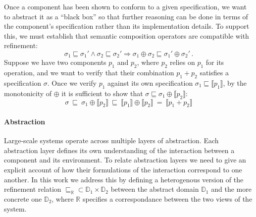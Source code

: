\documentclass[sigplan,10pt,review,anonymous]{acmart}
\begin{document}
Once a component has been shown to conform to a given specification,
we want to abstract it as a ``black box''
so that further reasoning can be done in terms of
the component's specification rather than its implementation details.
To support this,
we must establish that semantic composition operators
are compatible with refinement:
\[ \sigma_1 \sqsubseteq \sigma_1' \wedge
   \sigma_2 \sqsubseteq \sigma_2' \Rightarrow
   \sigma_1 \oplus \sigma_2 \sqsubseteq \sigma_1' \oplus \sigma_2' \,. \]
Suppose we have two components $p_1$ and $p_2$,
where $p_2$ relies on $p_1$ for its operation,
and we want to verify that their combination $p_1 + p_2$
satisfies a specification $\sigma$.
Once we verify $p_1$ against its own specification
$\sigma_1 \sqsubseteq \llbracket p_1 \rrbracket$,
by the monotonicity of ${\oplus}$ it is sufficient to show that
$\sigma \sqsubseteq \sigma_1 \oplus \llbracket p_2 \rrbracket$:
\[
   \sigma \:\sqsubseteq\:
   \sigma_1 \oplus \llbracket p_2 \rrbracket \:\sqsubseteq\:
   \llbracket p_1 \rrbracket \oplus \llbracket p_2 \rrbracket \:=\:
   \llbracket p_1 + p_2 \rrbracket
\]


\paragraph{Abstraction} %

Large-scale systems operate across multiple layers of abstraction.
Each abstraction layer defines its own understanding of the interaction
between a component and its environment.
To relate abstraction layers we need to give
an explicit account of how their formulations of the interaction
correspond to one another.
In this work we address this by defining a heterogenous version
of the refinement relation
${\sqsubseteq_\mathbb{R}} \subset
 \mathbb{D}_1 \times \mathbb{D}_2$ between
the abstract domain $\mathbb{D}_1$ and
the more concrete one $\mathbb{D}_2$, where
$\mathbb{R}$ specifies a correspondance between
the two views of the system.

\end{document}
